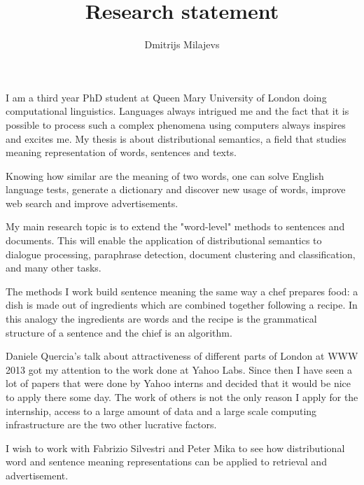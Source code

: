 \documentclass[11pt]{article}
\title{Research statement}
\author{
Dmitrijs Milajevs \\
}
\date{}
\begin{document}
\maketitle

\thispagestyle{empty}


I am a third year PhD student at Queen Mary University of London doing computational linguistics. Languages always intrigued me and the fact that it is possible to process such a complex phenomena using computers always inspires and excites me. My thesis is about distributional semantics, a field that studies meaning representation of words, sentences and texts.

Knowing how similar are the meaning of two words, one can solve English language tests, generate a dictionary and discover new usage of words, improve web search and improve advertisements.

My main research topic is to extend the "word-level" methods to sentences and documents. This will enable the application of distributional semantics to dialogue processing, paraphrase detection, document clustering and classification, and many other tasks.

The methods I work build sentence meaning the same way a chef prepares food: a dish is made out of ingredients which are combined together following a recipe. In this analogy the ingredients are words and the recipe is the grammatical structure of a sentence and the chief is an algorithm.

Daniele Quercia's talk about attractiveness of different parts of London at WWW 2013 got my attention to the work done at Yahoo Labs. Since then I have seen a lot of papers that were done by Yahoo interns and decided that it would be nice to apply there some day. The work of others is not the only reason I apply for the internship, access to a large amount of data and a large scale computing infrastructure are the two other lucrative factors.

I wish to work with Fabrizio Silvestri and Peter Mika to see how distributional word and sentence meaning representations can be applied to retrieval and advertisement.
\end{document}
